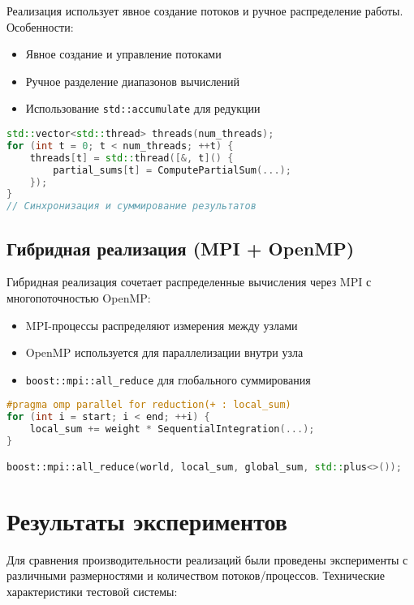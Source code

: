 \documentclass[14pt,a4paper]{extarticle}
\begin{document}
Реализация использует явное создание потоков и ручное распределение работы. Особенности:

\begin{itemize}
    \item Явное создание и управление потоками
    \item Ручное разделение диапазонов вычислений
    \item Использование \texttt{std::accumulate} для редукции
\end{itemize}

\begin{lstlisting}[language=C++]
std::vector<std::thread> threads(num_threads);
for (int t = 0; t < num_threads; ++t) {
    threads[t] = std::thread([&, t]() {
        partial_sums[t] = ComputePartialSum(...);
    });
}
// Синхронизация и суммирование результатов
\end{lstlisting}

\subsection{Гибридная реализация (MPI + OpenMP)}
Гибридная реализация сочетает распределенные вычисления через MPI с многопоточностью OpenMP:

\begin{itemize}
    \item MPI-процессы распределяют измерения между узлами
    \item OpenMP используется для параллелизации внутри узла
    \item \texttt{boost::mpi::all\_reduce} для глобального суммирования
\end{itemize}

\begin{lstlisting}[language=C++]
#pragma omp parallel for reduction(+ : local_sum)
for (int i = start; i < end; ++i) {
    local_sum += weight * SequentialIntegration(...);
}

boost::mpi::all_reduce(world, local_sum, global_sum, std::plus<>());
\end{lstlisting}
\newpage

\section{Результаты экспериментов}
Для сравнения производительности реализаций были проведены эксперименты с различными размерностями и количеством потоков/процессов. Технические характеристики тестовой системы:
\end{document}
